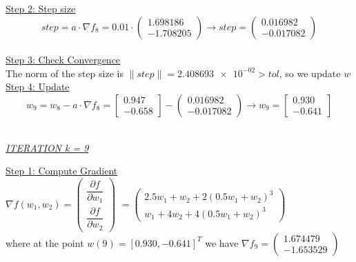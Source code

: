 \underline{Step 2: Step size}
\[
step = a \cdot \nabla f_{8} = 0.01 \cdot \left(\begin{array}{c}
	1.698186 \\
-1.708205
\end{array}\right) \rightarrow step =\left(\begin{array}{c}
	0.016982 \\
	-0.017082
\end{array}\right)
\]
\\[4mm]

\underline{Step 3: Check Convergence}\\
The norm of the step size is $\| step \| = \num{2.408693e-02} > tol$, so we update $w$
\\[4mm]

\underline{Step 4: Update}
\[ 
w_9 = w_8 - a\cdot \nabla f_8 =  \left[\begin{array}{c}
	0.947\\
	-0.658
\end{array}\right] - \left(\begin{array}{c}
	0.016982 \\
-0.017082
\end{array}\right) \rightarrow
w_9 = \left[\begin{array}{c}
	0.930\\
	-0.641
\end{array}\right]
\]
\\[4mm]

\begin{center}
	\underline{\textit{ITERATION k = 9}}
\end{center}

\underline{Step 1: Compute Gradient}\\
\(\nabla f(w_1,w_2) = \left(\begin{array}{c}
	\dfrac{\partial f}{\partial w_1} \\[4mm]
	\dfrac{\partial f}{\partial w_2}
\end{array}\right)\) $= \left(\begin{array}{c}
	2.5w_1 + w_2 + 2(0.5w_1+w_2)^3\\[1mm]
	w_1 + 4w_2 + 4(0.5w_1+w_2)^3
\end{array}\right)$ \\[3mm]

where at the point $w\left(9\right) = \left[0.930,	-0.641\right]^T$ we have $\nabla f_{9} = \left(\begin{array}{c}
	1.674479 \\
	-1.653529
\end{array}\right)$
\\[4mm]

